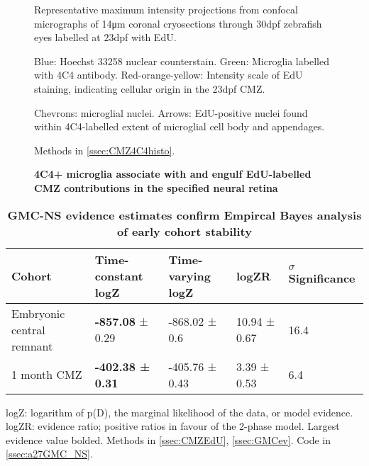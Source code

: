 \begin{figure}[!h]
    \caption{{\bf 4C4+ microglia associate with and engulf EdU-labelled CMZ contributions in the specified neural retina}}
    Representative maximum intensity projections from confocal micrographs of 14\si{\micro\metre} coronal cryosections through 30dpf zebrafish eyes labelled at 23dpf with EdU.
    
    Blue: Hoechst 33258 nuclear counterstain. Green: Microglia labelled with 4C4 antibody. Red-orange-yellow: Intensity scale of EdU staining, indicating cellular origin in the 23dpf CMZ.

    Chevrons: microglial nuclei. Arrows: EdU-positive nuclei found within 4C4-labelled extent of microglial cell body and appendages.
    
    Methods in \autoref{ssec:CMZ4C4histo}.
    \label{CMZ4C4micrograph}
\end{figure}

\begin{table}[!ht]
    \centering
    \caption{{\bf GMC-NS evidence estimates confirm Empircal Bayes analysis of early cohort stability}}
    \begin{tabular}{|l|l|l|l|l|} \hline 
        {\bf Cohort} & {\bf Time-constant logZ} & {\bf Time-varying logZ} & {\bf logZR} & {\bf $\sigma$ Significance}\\ \hline
        Embryonic central remnant & {\bf -857.08} ± 0.29 & -868.02 ± 0.6 & 10.94 ± 0.67 & 16.4\\ \hline
        1 month CMZ & {\bf -402.38 ± 0.31} & -405.76 ± 0.43 & 3.39 ± 0.53 & 6.4\\ \hline
    \end{tabular}
    \begin{flushleft} logZ: logarithm of p(D), the marginal likelihood of the data, or model evidence. logZR: evidence ratio; positive ratios in favour of the 2-phase model. Largest evidence value bolded.
    Methods in \autoref{ssec:CMZEdU}, \autoref{ssec:GMCev}.
    Code in \autoref{ssec:a27GMC_NS}.
    \end{flushleft}
    \label{turnoverGMCtable}
\end{table}

